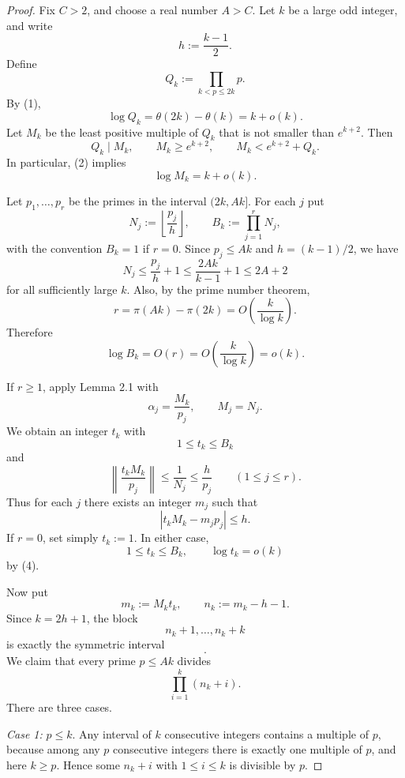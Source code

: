 \documentclass[11pt]{article}
\begin{document}
\begin{proof}
Fix $C>2$, and choose a real number $A>C$. Let $k$ be a large odd integer, and write
\[
h:=\frac{k-1}{2}.
\]
Define
\[
Q_k:=\prod_{k<p\le 2k}p.
\]
By (1),
\begin{equation}
\log Q_k=\theta(2k)-\theta(k)=k+o(k).
\end{equation}
Let $M_k$ be the least positive multiple of $Q_k$ that is not smaller than $e^{k+2}$. Then
\[
Q_k\mid M_k,\qquad M_k\ge e^{k+2},\qquad M_k<e^{k+2}+Q_k.
\]
In particular, (2) implies
\begin{equation}
\log M_k=k+o(k).
\end{equation}

Let $p_1,\dots,p_r$ be the primes in the interval $(2k,Ak]$. For each $j$ put
\[
N_j:=\left\lfloor \frac{p_j}{h}\right\rfloor,\qquad B_k:=\prod_{j=1}^r N_j,
\]
with the convention $B_k=1$ if $r=0$. Since $p_j\le Ak$ and $h=(k-1)/2$, we have
\[
N_j\le \frac{p_j}{h}+1\le \frac{2Ak}{k-1}+1\le 2A+2
\]
for all sufficiently large $k$. Also, by the prime number theorem,
\[
r=\pi(Ak)-\pi(2k)=O\!\left(\frac{k}{\log k}\right).
\]
Therefore
\begin{equation}
\log B_k=O(r)=O\!\left(\frac{k}{\log k}\right)=o(k).
\end{equation}

If $r\ge 1$, apply Lemma 2.1 with
\[
\alpha_j=\frac{M_k}{p_j},\qquad M_j=N_j.
\]
We obtain an integer $t_k$ with
\[
1\le t_k\le B_k
\]
and
\[
\left\|\frac{t_kM_k}{p_j}\right\|\le \frac{1}{N_j}\le \frac{h}{p_j}\qquad (1\le j\le r).
\]
Thus for each $j$ there exists an integer $m_j$ such that
\begin{equation}
|t_kM_k-m_jp_j|\le h.
\end{equation}
If $r=0$, set simply $t_k:=1$. In either case,
\begin{equation}
1\le t_k\le B_k,\qquad \log t_k=o(k)
\end{equation}
by (4).

Now put
\[
m_k:=M_kt_k,\qquad n_k:=m_k-h-1.
\]
Since $k=2h+1$, the block
\[
n_k+1,\dots,n_k+k
\]
is exactly the symmetric interval
\begin{equation}
[m_k-h,m_k+h].
\end{equation}
We claim that every prime $p\le Ak$ divides
\[
\prod_{i=1}^k(n_k+i).
\]
There are three cases.

\textit{Case 1:} $p\le k$. Any interval of $k$ consecutive integers contains a multiple of $p$, because among any $p$ consecutive integers there is exactly one multiple of $p$, and here $k\ge p$. Hence some $n_k+i$ with $1\le i\le k$ is divisible by $p$.


\end{proof}
\end{document}
